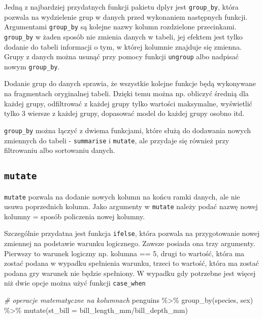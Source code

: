 \documentclass[
]{book}
\newenvironment{Shaded}{\begin{snugshade}}{\end{snugshade}}
\newcommand{\AttributeTok}[1]{\textcolor[rgb]{0.77,0.63,0.00}{#1}}
\newcommand{\CommentTok}[1]{\textcolor[rgb]{0.56,0.35,0.01}{\textit{#1}}}
\newcommand{\FunctionTok}[1]{\textcolor[rgb]{0.00,0.00,0.00}{#1}}
\newcommand{\NormalTok}[1]{#1}
\newcommand{\SpecialCharTok}[1]{\textcolor[rgb]{0.00,0.00,0.00}{#1}}
\begin{document}
Jedną z najbardziej przydatnych funkcji pakietu dplyr jest \texttt{group\_by}, która pozwala na wydzielenie grup w danych przed wykonaniem następnych funkcji. Argumentami \texttt{group\_by} są kolejne nazwy kolumn rozdzielone przecinkami. \texttt{group\_by} w żaden sposób nie zmienia danych w tabeli, jej efektem jest tylko dodanie do tabeli informacji o tym, w której kolumnie znajduje się zmienna. Grupy z danych można usunąć przy pomocy funkcji \texttt{ungroup} albo nadpisać nowym \texttt{group\_by}.

Dodanie grup do danych sprawia, że wszystkie kolejne funkcje będą wykonywane na fragmentach oryginalnej tabeli. Dzięki temu można np. obliczyć średnią dla każdej grupy, odfiltrować z każdej grupy tylko wartości maksymalne, wyświetlić tylko 3 wiersze z każdej grupy, dopasować model do każdej grupy osobno itd.

\texttt{group\_by} można łączyć z dwiema funkcjami, które służą do dodawania nowych zmiennych do tabeli - \texttt{summarise} i \texttt{mutate}, ale przydaje się również przy filtrowaniu albo sortowaniu danych.

\hypertarget{mutate}{%
\subsection{\texorpdfstring{\texttt{mutate}}{mutate}}\label{mutate}}

\texttt{mutate} pozwala na dodanie nowych kolumn na końcu ramki danych, ale nie usuwa poprzednich kolumn. Jako argumenty w \texttt{mutate} należy podać nazwę nowej kolumny = sposób policzenia nowej kolumny.

Szczególnie przydatna jest funkcja \texttt{ifelse}, która pozwala na przygotowanie nowej zmiennej na podstawie warunku logicznego. Zawsze posiada ona trzy argumenty. Pierwszy to warunek logiczny np. kolumna == 5, drugi to wartość, która ma zostać podana w wypadku spełnienia warunku, trzeci to wartość, która ma zostać podana gry warunek nie będzie spełniony. W wypadku gdy potrzebne jest więcej niż dwie opcje można użyć funkcji \texttt{case\_when}

\begin{Shaded}
\begin{Highlighting}[]
\CommentTok{\# operacje matematyczne na kolumnach}
\NormalTok{penguins }\SpecialCharTok{\%\textgreater{}\%} \FunctionTok{group\_by}\NormalTok{(species, sex) }\SpecialCharTok{\%\textgreater{}\%} \FunctionTok{mutate}\NormalTok{(}\AttributeTok{st\_bill =}\NormalTok{ bill\_length\_mm}\SpecialCharTok{/}\NormalTok{bill\_depth\_mm)}
\end{Highlighting}
\end{Shaded}
\end{document}
